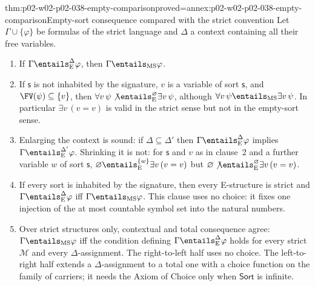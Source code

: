 \begin{hbtheorem}{thm:p02-w02-p02-038-empty-comparison}{proved=annex:p02-w02-p02-038-empty-comparison}{Empty-sort consequence compared with the strict convention}
Let \(\Gamma\cup\{\varphi\}\) be formulas of the strict language and
\(\Delta\) a context containing all their free variables.
\begin{enumerate}
\item If \(\Gamma\entails^{\Delta}_{\mathrm E}\varphi\), then
      \(\Gamma\entails_{\mathrm{MS}}\varphi\).
\item If \(\mathsf s\) is not inhabited by the signature, \(v\) is a variable
      of sort \(\mathsf s\), and \(\FV(\psi)\subseteq\{v\}\), then
      \(\forall v\,\psi\not\entails^{\varnothing}_{\mathrm E}\exists v\,\psi\),
      although \(\forall v\,\psi\entails_{\mathrm{MS}}\exists v\,\psi\).
      In particular \(\exists v\,(v=v)\) is valid in the strict sense but
      not in the empty-sort sense.
\item Enlarging the context is sound: if \(\Delta\subseteq\Delta'\) then
      \(\Gamma\entails^{\Delta}_{\mathrm E}\varphi\) implies
      \(\Gamma\entails^{\Delta'}_{\mathrm E}\varphi\).  Shrinking it is not:
      for \(\mathsf s\) and \(v\) as in clause~2 and a further variable
      \(w\) of sort \(\mathsf s\),
      \(\varnothing\entails^{\{w\}}_{\mathrm E}\exists v\,(v=v)\) but
      \(\varnothing\not\entails^{\varnothing}_{\mathrm E}\exists v\,(v=v)\).
\item If every sort is inhabited by the signature, then every E-structure
      is strict and \(\Gamma\entails^{\Delta}_{\mathrm E}\varphi\) iff
      \(\Gamma\entails_{\mathrm{MS}}\varphi\).  This clause uses no choice:
      it fixes one injection of the at most countable symbol set into the
      natural numbers.
\item Over strict structures only, contextual and total consequence agree:
      \(\Gamma\entails_{\mathrm{MS}}\varphi\) iff the condition defining
      \(\Gamma\entails^{\Delta}_{\mathrm E}\varphi\) holds for every strict
      \(\mathcal M\) and every \(\Delta\)-assignment.  The right-to-left
      half uses no choice.  The left-to-right half extends a
      \(\Delta\)-assignment to a total one with a choice function on the
      family of carriers; it needs the Axiom of Choice only when
      \(\mathsf{Sort}\) is infinite.
\end{enumerate}
\end{hbtheorem}


